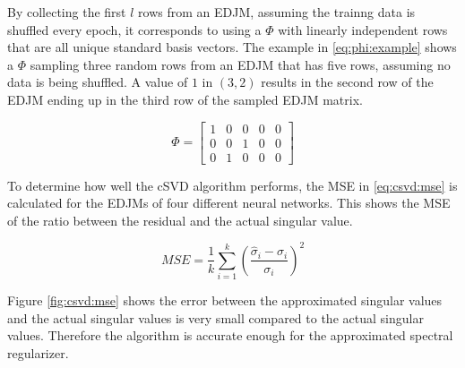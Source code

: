 By collecting the first $l$ rows from an EDJM, assuming the trainng data is shuffled every epoch, it corresponds to using a $\Phi$ with linearly independent rows that are all unique standard basis vectors. The example in \eqref{eq:phi:example} shows a $\Phi$ sampling three random rows from an EDJM that has five rows, assuming no data is being shuffled. A value of $1$ in $(3,2)$ results in the second row of the EDJM ending up in the third row of the sampled EDJM matrix.


\begin{equation} \label{eq:phi:example}
    \Phi =
    \begin{bmatrix}
    1 & 0 & 0 & 0 & 0 \\
    0 & 0 & 1 & 0 & 0 \\
    0 & 1 & 0 & 0 & 0
    \end{bmatrix}
\end{equation}



To determine how well the cSVD algorithm performs, the MSE in \eqref{eq:csvd:mse} is calculated for the EDJMs of four different neural networks. This shows the MSE of the ratio between the residual and the actual singular value.

\begin{equation} \label{eq:csvd:mse}
    MSE = \frac{1}{k}\sum_{i=1}^k \left ( \frac{\hat \sigma_{i} - \sigma_i}{\sigma_i} \right )^2
\end{equation}

Figure \ref{fig:csvd:mse} shows the error between the approximated singular values and the actual singular values is very small compared to the actual singular values. Therefore the algorithm is accurate enough for the approximated spectral regularizer.